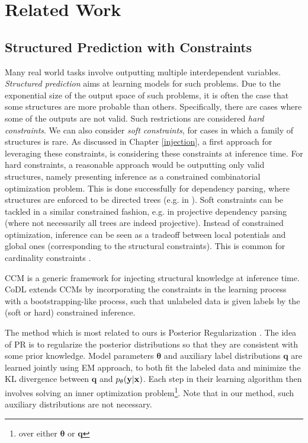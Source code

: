 \chapter{Related Work} 
\label{chap:Related_Work}

\section{Structured Prediction with Constraints}
\label{struct_pred_constraint}
Many real world tasks involve outputting multiple interdependent variables. \textit{Structured prediction} aims at learning models for such problems. Due to the exponential size of the output space of such problems, it is often the case that some structures are more probable than others. Specifically, there are cases where some of the outputs are not valid. Such  restrictions are considered \textit{hard constraints}. We can also consider \textit{soft constraints}, for cases in which a family of structures is rare. As discussed in Chapter \ref{injection}, a first approach for leveraging these constraints, is  considering these constraints at inference time. For hard constraints, a reasonable approach would be outputting only valid structures, namely presenting inference as a constrained combinatorial optimization problem. This is done successfully for dependency parsing, where structures are enforced to be directed trees (e.g. in \cite{mcdonald_non-projective_2005}). Soft constraints can be tackled in a similar constrained fashion, e.g. in projective dependency parsing \cite{zhang_dependency_2016} (where not necessarily all trees are indeed projective). Instead of constrained optimization, inference can be seen as a tradeoff between local potentials and global ones (corresponding to the structural constraints). This is common for cardinality constraints \cite{gupta_efficient_2007, tarlow_fast_2012}. 

CCM \cite{chang_learning_2008} is a generic framework for injecting structural knowledge at inference time. CoDL \cite{chang_guiding_2007} extends CCMs by incorporating the constraints in the learning process with a bootstrapping-like process, such that unlabeled data is given labels by the (soft or hard) constrained inference. 

The method which is most related to ours is Posterior Regularization \cite{ganchev_posterior_2010}. The idea of PR is to regularize the posterior distributions so that they are consistent with some prior knowledge. Model parameters $\mathbf{\theta}$ and auxiliary label distributions $\mathbf{q}$ are learned jointly using EM approach, to both fit the labeled data and minimize the KL divergence between $\mathbf{q}$ and $p_\theta(\mathbf{y}|\mathbf{x})$. Each step  in their learning algorithm then involves solving an inner optimization problem\footnote{over either $\mathbf{\theta}$ or $\mathbf{q}$}. Note that in our method, such auxiliary distributions are not necessary. 


